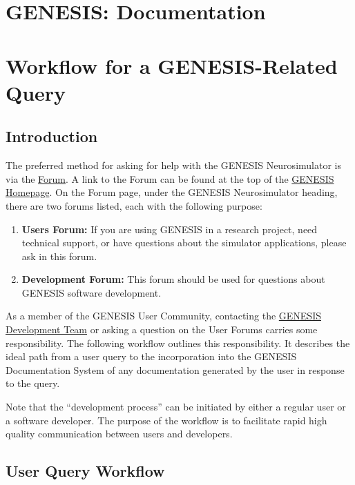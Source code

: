 \documentclass[12pt]{article}
\begin{document}
\section*{GENESIS: Documentation}

\section*{Workflow for a GENESIS-Related Query}

\subsection*{Introduction}

The preferred method for asking for help with the GENESIS Neurosimulator is via the \href{http://www.genesis-sim.org/forum}{Forum}. A link to the Forum can be found at the top of the \href{http://www.genesis-sim.org/}{GENESIS Homepage}. On the Forum page, under the GENESIS Neurosimulator heading, there are two forums listed, each with the following purpose:

\begin{enumerate}
\item {\bf Users Forum:} If you are using GENESIS in a research project, need technical support, or have questions about the simulator applications, please ask in this forum.
\item {\bf Development Forum:} This forum should be used for questions about GENESIS software development.
\end{enumerate}

As a member of the GENESIS User Community, contacting the \href{http://www.genesis-sim.org/contact}{GENESIS Development Team} or asking a question on the User Forums carries some responsibility. The following workflow outlines this responsibility. It describes the ideal path from a user query to the incorporation into the GENESIS Documentation System of any documentation generated by the user in response to the query.

Note that the ``development process'' can be initiated by either a regular user or a software developer. The purpose of the workflow is to facilitate rapid high quality communication between users and developers. 

\subsection*{User Query Workflow}
\end{document}
